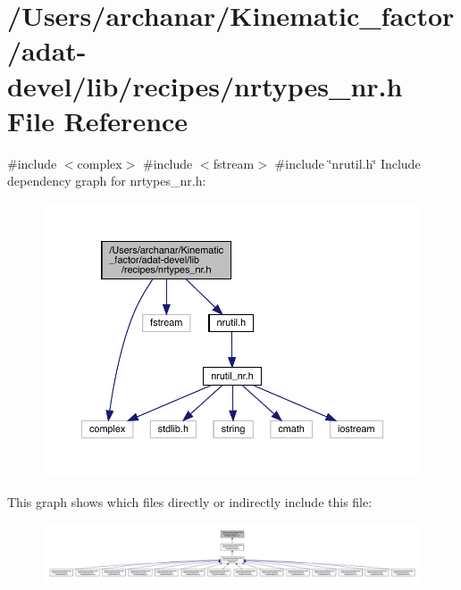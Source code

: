 \hypertarget{adat-devel_2lib_2recipes_2nrtypes__nr_8h}{}\section{/\+Users/archanar/\+Kinematic\+\_\+factor/adat-\/devel/lib/recipes/nrtypes\+\_\+nr.h File Reference}
\label{adat-devel_2lib_2recipes_2nrtypes__nr_8h}
{\ttfamily \#include $<$complex$>$}\newline
{\ttfamily \#include $<$fstream$>$}\newline
{\ttfamily \#include \char`\"{}nrutil.\+h\char`\"{}}\newline
Include dependency graph for nrtypes\+\_\+nr.\+h\+:
\nopagebreak
\begin{figure}[H]
\begin{center}
\leavevmode
\includegraphics[width=350pt]{d4/dd1/adat-devel_2lib_2recipes_2nrtypes__nr_8h__incl}
\end{center}
\end{figure}
This graph shows which files directly or indirectly include this file\+:
\nopagebreak
\begin{figure}[H]
\begin{center}
\leavevmode
\includegraphics[width=350pt]{d9/d67/adat-devel_2lib_2recipes_2nrtypes__nr_8h__dep__incl}
\end{center}
\end{figure}
